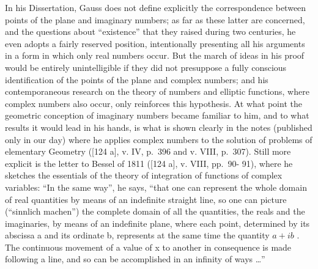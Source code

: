 In his Dissertation, Gauss does not define explicitly the correspondence between points of the plane and imaginary numbers; as far as these latter are concerned, and the questions about ``existence'' that they raised during two centuries, he even adopts a fairly reserved position, intentionally presenting all his arguments in a form in which only real numbers occur. But the march of ideas in his proof would be entirely unintelligible if they did not presuppose a fully conscious identification of the points of the plane and complex numbers; and his contemporaneous research on the theory of numbers and elliptic functions, where complex numbers also occur, only reinforces this hypothesis. At what point the geometric conception of imaginary numbers became familiar to him, and to what results it would lead in his hands, is what is shown clearly in the notes (published only in our day) where he applies complex numbers to the solution of problems of elementary Geometry ({[}124 a{]}, v. IV, p.~396 and v. VIII, p.~307). Still more explicit is the letter to Bessel of 1811 ({[}124 a{]}, v. VIII, pp.~90- 91), where he sketches the essentials of the theory of integration of functions of complex variables: ``In the same way'', he says, ``that one can represent the whole domain of real quantities by means of an indefinite straight line, so one can picture (``sinnlich machen'') the complete domain of all the quantities, the reals and the imaginaries, by means of an indefinite plane, where each point, determined by its abscissa a and its ordinate b, represents at the same time the quantity \(a + ib\) . The continuous movement of a value of x to another in consequence is made following a line, and so can be accomplished in an infinity of ways \ldots''

